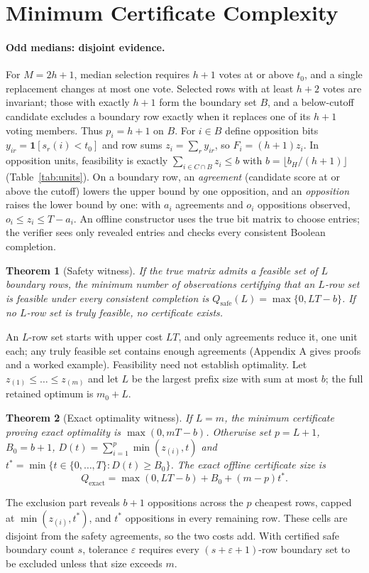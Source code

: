 \documentclass[11pt]{article}
\newtheorem{theorem}{Theorem}
\newcommand{\Qx}{Q_{\mathrm{exact}}}
\newcommand{\bH}{b_H}
\newcommand{\ind}{\mathbf{1}}
\begin{document}
\section{Minimum Certificate Complexity}
\label{sec:minimum}
\paragraph{Odd medians: disjoint evidence.} For $M=2h+1$, median selection requires $h+1$ votes at or above $t_0$, and a single replacement changes at most one vote. Selected rows with at least $h+2$ votes are invariant; those with exactly $h+1$ form the boundary set $B$, and a below-cutoff candidate excludes a boundary row exactly when it replaces one of its $h+1$ voting members. Thus $p_i=h+1$ on $B$. For $i\in B$ define opposition bits $y_{ir}=\ind[s_r(i)<t_0]$ and row sums $z_i=\sum_r y_{ir}$, so $F_i=(h+1)z_i$. In opposition units, feasibility is exactly $\sum_{i\in C\cap B}z_i\le b$ with $b=\lfloor \bH/(h+1)\rfloor$ (Table~\ref{tab:units}). On a boundary row, an \emph{agreement} (candidate score at or above the cutoff) lowers the upper bound by one opposition, and an \emph{opposition} raises the lower bound by one: with $a_i$ agreements and $o_i$ oppositions observed, $o_i\le z_i\le T-a_i$. An offline constructor uses the true bit matrix to choose entries; the verifier sees only revealed entries and checks every consistent Boolean completion.

\begin{theorem}[Safety witness]
\label{thm:safety}
If the true matrix admits a feasible set of $L$ boundary rows, the minimum number of observations certifying that an $L$-row set is feasible under every consistent completion is $Q_{\mathrm{safe}}(L)=\max\{0,LT-b\}$. If no $L$-row set is truly feasible, no certificate exists.
\end{theorem}
An $L$-row set starts with upper cost $LT$, and only agreements reduce it, one unit each; any truly feasible set contains enough agreements (Appendix A gives proofs and a worked example). Feasibility need not establish optimality. Let $z_{(1)}\le\dots\le z_{(m)}$ and let $L$ be the largest prefix size with sum at most $b$; the full retained optimum is $m_0+L$.

\begin{theorem}[Exact optimality witness]
\label{thm:exact}
If $L=m$, the minimum certificate proving exact optimality is $\max(0,mT-b)$. Otherwise set $p=L+1$, $B_0=b+1$, $D(t)=\sum_{i=1}^{p}\min(z_{(i)},t)$ and $t^*=\min\{t\in\{0,\dots,T\}:D(t)\ge B_0\}$. The exact offline certificate size is
\begin{equation}
\Qx=\max(0,LT-b)+B_0+(m-p)t^*.
\label{eq:qexact}
\end{equation}
\end{theorem}
The exclusion part reveals $b+1$ oppositions across the $p$ cheapest rows, capped at $\min(z_{(i)},t^*)$, and $t^*$ oppositions in every remaining row. These cells are disjoint from the safety agreements, so the two costs add. With certified safe boundary count $s$, tolerance $\varepsilon$ requires every $(s+\varepsilon+1)$-row boundary set to be excluded unless that size exceeds $m$.
\end{document}
